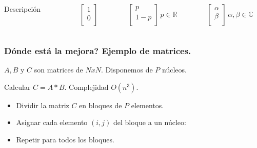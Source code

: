 \documentclass{beamer}
\begin{document}
\begin{frame}[t]
\begin{columns}[b]
	\begin{column}{0.25\textwidth}
		Descripción
	\end{column}
	\begin{column}{0.25\textwidth}
		$$ \begin{bmatrix}
			1 \\
			0 \\
			\end{bmatrix} $$
	\end{column}
	\begin{column}{0.25\textwidth}
		$$ \begin{bmatrix}
			p \\
			1-p \\
			\end{bmatrix}
			\, p \in \mathbb{R} $$
	\end{column}
	\begin{column}{0.25\textwidth}
		$$ \begin{bmatrix}
			\alpha \\
			\beta \\
			\end{bmatrix} 
			\, \alpha, \beta \in \mathbb{C} $$
	\end{column}
\end{columns}

\end{frame}
\begin{frame}
\frametitle{}

\end{frame}



\begin{frame}
\frametitle{Dónde está la mejora? Ejemplo de matrices.}

$A, B$ y $C$ son matrices de $NxN$. Disponemos de $P$ núcleos.

Calcular $C = A * B$. Complejidad $ O(n^3) $.


\begin{itemize}
\item Dividir la matriz $C$ en bloques de $P$ elementos.
\item Asignar cada elemento $(i,j)$ del bloque a un núcleo:
\item Repetir para todos los bloques.
\end{itemize}

\end{frame}
\end{document}
